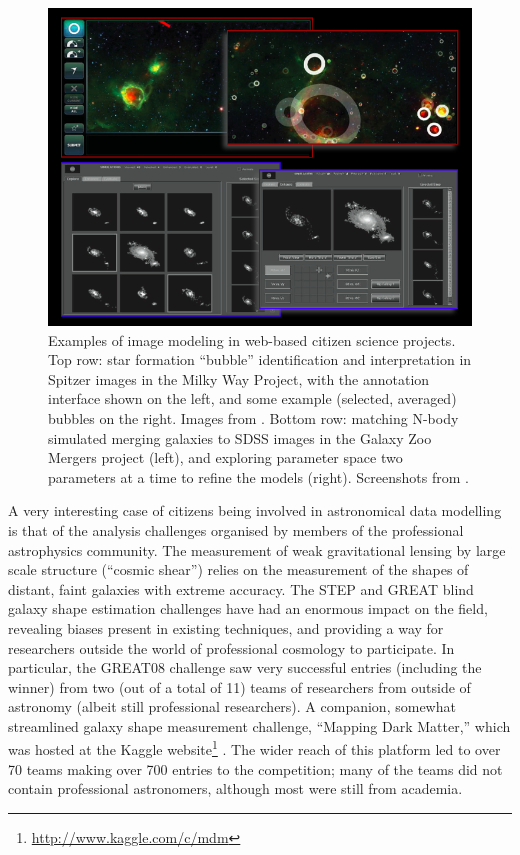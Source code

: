 \documentclass{ar2e}
\begin{document}
\begin{figure}[!ht]
\centering\includegraphics[width=\linewidth]{figs/modeling.png}
\caption{Examples of image modeling in web-based citizen science projects. Top
row: star formation ``bubble'' identification and interpretation in Spitzer
images in the Milky Way Project, with the annotation interface shown on the
left, and some example (selected, averaged) bubbles on the right. Images from
\citet{SimpsonEtal2012}. Bottom row: matching N-body simulated merging
galaxies to SDSS images in the Galaxy Zoo Mergers project (left), and
exploring parameter space two parameters at a time to refine the models
(right). Screenshots from \citet{HolincheckEtal2010}.}
\label{fig:modeling}
\end{figure}


A very interesting case of citizens being involved in astronomical 
data modelling is that of the analysis challenges organised by members of
the professional astrophysics community. The measurement of weak gravitational
lensing by large scale structure (``cosmic shear'') relies on the measurement
of the shapes of distant, faint galaxies with extreme accuracy. The STEP
\citep{HeymansEtal2006,MasseyEtal2007} and GREAT
\citep{BridleEtal2010,KitchingEtal2012,KitchingEtal2013a} blind galaxy shape
estimation challenges have had an enormous impact on the field, revealing
biases present in existing techniques, and providing a way for researchers
outside the world of professional cosmology to participate. In particular, the
GREAT08 challenge saw very successful entries (including the winner) from two
(out of a total of 11) teams of researchers from outside of astronomy (albeit
still professional researchers). A companion, somewhat streamlined galaxy
shape measurement challenge, ``Mapping Dark Matter,'' which was hosted at the
Kaggle website\footnote{\url{http://www.kaggle.com/c/mdm}} 
\citep{KitchingEtal2013b}. The wider reach of this platform led to over 70
teams making over 700 entries to the competition; many of the teams did not
contain professional astronomers, although most were still from academia.
\end{document}
